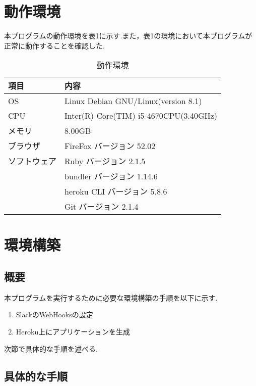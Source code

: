 \documentclass[fleqn, 14pt]{sty/extarticlej}
\begin{document}
\section{動作環境}
本プログラムの動作環境を表1に示す.また，表1の環境において本ブログラムが正常に動作することを確認した.

\begin{table}[tb]
  \begin{center}
    \caption{動作環境}\label{tab:time_range_ratio}
    \begin{tabular}{l|l}
      \hline\hline
      \multicolumn{1}{l|}{項目} & \multicolumn{1}{l|}{内容} \\
      \hline
      
      OS & Linux Debian GNU/Linux(version 8.1) \\
      CPU & Inter(R) Core(TIM) i5-4670CPU(3.40GHz) \\
      メモリ & 8.00GB \\
      ブラウザ & FireFox バージョン 52.02 \\
      ソフトウェア & Ruby バージョン 2.1.5\\
                 & bundler バージョン 1.14.6\\
                 & heroku CLI バージョン 5.8.6\\
                 & Git バージョン 2.1.4\\
      \hline
    \end{tabular}
  \end{center}
\end{table}

\section{環境構築}
\subsection{概要}
本プログラムを実行するために必要な環境構築の手順を以下に示す.
\begin{enumerate}
\item SlackのWebHooksの設定
\item Heroku上にアプリケーションを生成
\end{enumerate}
次節で具体的な手順を述べる.
\subsection{具体的な手順}
\end{document}
